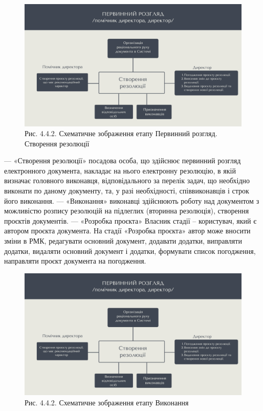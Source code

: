 \begin{figure}[!htbp]
\centerline{\includegraphics[width=\textwidth]{img/4.4.2.png}}
\caption{Рис. 4.4.2. Схематичне зображення етапу Первинний розгляд. Створення резолюції}
\end{figure}

--- «Створення резолюції» посадова особа, що здійснює первинний розгляд
електронного документа, накладає на нього електронну резолюцію, в якій
визначає головного виконавця, відповідального за перелік задач, що
необхідно виконати по даному документу, та, у разі необхідності,
співвиконавців і строк його виконання.
--- «Виконання» виконавці здійснюють роботу над документом з можливістю
розпису резолюцій на підлеглих (вторинна резолюція), створення проєктів
документів.
--- «Розробка проєкта» Власник стадії – користувач, який є автором проєкта
документа. На стадії «Розробка проєкта» автор може вносити зміни в РМК,
редагувати основний документ, додавати додатки, виправляти додатки,
видаляти основний документ і додатки, формувати список погодження,
направляти проєкт документа на погодження.

\begin{figure}[!htbp]
\centerline{\includegraphics[width=\textwidth]{img/4.4.2.png}}
\caption{Рис. 4.4.2. Схематичне зображення етапу Виконання}
\end{figure}

